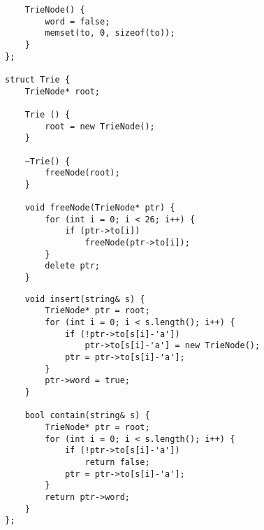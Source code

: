 \documentclass{article}
\begin{document}
\begin{multicols}{2}
\begin{lstlisting}
	TrieNode() {
		word = false;
		memset(to, 0, sizeof(to));
	}
};

struct Trie {
	TrieNode* root;

	Trie () {
		root = new TrieNode();
	}

	~Trie() {
		freeNode(root);
	}

	void freeNode(TrieNode* ptr) {
		for (int i = 0; i < 26; i++) {
			if (ptr->to[i])
				freeNode(ptr->to[i]);
		}
		delete ptr;
	}

\end{lstlisting}
\columnbreak
\begin{lstlisting}
	void insert(string& s) {
		TrieNode* ptr = root;
		for (int i = 0; i < s.length(); i++) {
			if (!ptr->to[s[i]-'a'])
				ptr->to[s[i]-'a'] = new TrieNode();
			ptr = ptr->to[s[i]-'a'];
		}
		ptr->word = true;
	}

	bool contain(string& s) {
		TrieNode* ptr = root;
		for (int i = 0; i < s.length(); i++) {
			if (!ptr->to[s[i]-'a'])
				return false;
			ptr = ptr->to[s[i]-'a'];
		}
		return ptr->word;
	}
};
\end{lstlisting}
\end{multicols}
 
\end{document}

